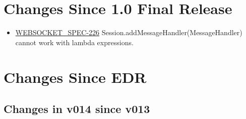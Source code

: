 \chapter{Changes Since 1.0 Final Release}

\begin{itemize}
\item \href {http://java.net/jira/browse/WEBSOCKET_SPEC-226}{WEBSOCKET\_SPEC-226} Session.addMessageHandler(MessageHandler) cannot work with lambda expressions.
\end{itemize}

\chapter{Changes Since EDR}

\section*{Changes in v014 since v013}

